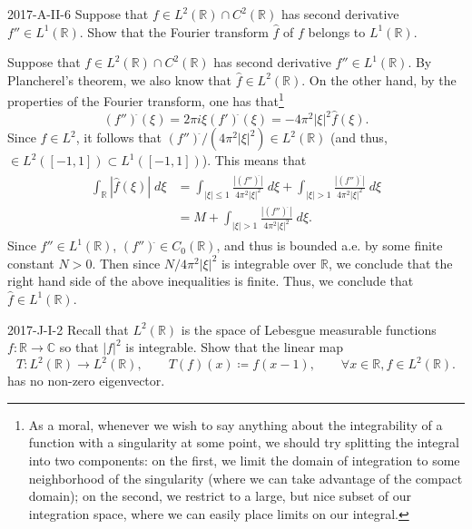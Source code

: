 \documentclass{article}
\begin{document}
	\begin{prb}{2017-A-II-6}
		Suppose that $f \in L^{2}(\mathbb{R}) \cap C^{2}(\mathbb{R})$ has second derivative $f'' \in L^{1}(\mathbb{R})$. Show that the Fourier transform $\hat{f}$ of $f$ belongs to $L^{1}(\mathbb{R})$. 
	\end{prb}
	Suppose that $f \in L^{2}(\mathbb{R}) \cap C^{2}(\mathbb{R})$ has second derivative $f'' \in L^{1}(\mathbb{R})$. By Plancherel's theorem, we also know that $\hat{f} \in L^{2}(\mathbb{R})$. On the other hand, by the properties of the Fourier transform, one has that\footnote{As a moral, whenever we wish to say anything about the integrability of a function with a singularity at some point, we should try splitting the integral into two components: on the first, we limit the domain of integration to some neighborhood of the singularity (where we can take advantage of the compact domain); on the second, we restrict to a large, but nice subset of our integration space, where we can easily place limits on our integral.}
	\begin{equation*}
		(f'')^{\hat{}}(\xi) = 2\pi i \xi (f')^{\hat{}}(\xi) = -4\pi^{2}|\xi|^{2}\hat{f}(\xi). 
	\end{equation*}
	Since $\hat{f} \in L^{2}$, it follows that $(f'')^{\hat{}}/(4\pi^{2}|\xi|^{2}) \in L^{2}(\mathbb{R})$ (and thus, $\in L^{2}([-1,1]) \subset L^{1}([-1,1])$). This means that 
	\begin{align*}
		\begin{split}
			\int_{\mathbb{R}} |\hat{f}(\xi)|\;d\xi &= \int_{|\xi| \leq 1}\frac{|(f'')^{\hat{}}|}{4\pi^2|\xi|^{2}}\;d\xi + \int_{|\xi| > 1}\frac{|(f'')^{\hat{}}|}{4\pi^{2}|\xi|^{2}}\;d\xi \\
			&= M + \int_{|\xi|> 1}\frac{|(f'')^{\hat{\hspace{2pt}}}|}{4\pi^2|\xi|^{2}}\;d\xi. 
		\end{split}
	\end{align*}
	Since $f'' \in L^{1}(\mathbb{R})$, $(f'')^{\hat{}} \in C_{0}(\mathbb{R})$, and thus is bounded a.e. by some finite constant $N > 0$. Then since $N/4\pi^{2}|\xi|^{2}$ is integrable over $\mathbb{R}$, we conclude that the right hand side of the above inequalities is finite. Thus, we conclude that $\hat{f} \in L^{1}(\mathbb{R})$. 
	\begin{prb}{2017-J-I-2}
		Recall that $L^2(\mathbb{R})$ is the space of Lebesgue measurable functions $f: \mathbb{R} \to \mathbb{C}$ so that $|f|^2$ is integrable. Show that the linear map
		\begin{equation*}
			T: L^2(\mathbb{R})  \to L^2(\mathbb{R}), \qquad T(f)(x) \coloneqq f(x-1), \qquad \forall x \in \mathbb{R}, f \in L^2(\mathbb{R}). 
		\end{equation*}
		has no non-zero eigenvector.
	\end{prb}
\end{document}
